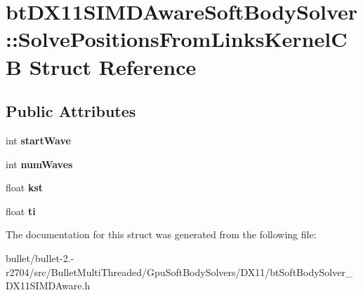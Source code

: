 \hypertarget{structbt_d_x11_s_i_m_d_aware_soft_body_solver_1_1_solve_positions_from_links_kernel_c_b}{\section{bt\+D\+X11\+S\+I\+M\+D\+Aware\+Soft\+Body\+Solver\+:\+:Solve\+Positions\+From\+Links\+Kernel\+C\+B Struct Reference}
\label{structbt_d_x11_s_i_m_d_aware_soft_body_solver_1_1_solve_positions_from_links_kernel_c_b}
}
\subsection*{Public Attributes}
\begin{DoxyCompactItemize}
\item 
\hypertarget{structbt_d_x11_s_i_m_d_aware_soft_body_solver_1_1_solve_positions_from_links_kernel_c_b_a654d6327235e044042f1e35dae898355}{int {\bfseries start\+Wave}}\label{structbt_d_x11_s_i_m_d_aware_soft_body_solver_1_1_solve_positions_from_links_kernel_c_b_a654d6327235e044042f1e35dae898355}

\item 
\hypertarget{structbt_d_x11_s_i_m_d_aware_soft_body_solver_1_1_solve_positions_from_links_kernel_c_b_a0fcad28c93856a2c5a8e5dfb55651402}{int {\bfseries num\+Waves}}\label{structbt_d_x11_s_i_m_d_aware_soft_body_solver_1_1_solve_positions_from_links_kernel_c_b_a0fcad28c93856a2c5a8e5dfb55651402}

\item 
\hypertarget{structbt_d_x11_s_i_m_d_aware_soft_body_solver_1_1_solve_positions_from_links_kernel_c_b_a6334f81a6199756e806f0ec4f60eb32d}{float {\bfseries kst}}\label{structbt_d_x11_s_i_m_d_aware_soft_body_solver_1_1_solve_positions_from_links_kernel_c_b_a6334f81a6199756e806f0ec4f60eb32d}

\item 
\hypertarget{structbt_d_x11_s_i_m_d_aware_soft_body_solver_1_1_solve_positions_from_links_kernel_c_b_ac9aae7fc709edbd1ac26e3296d8c4ac3}{float {\bfseries ti}}\label{structbt_d_x11_s_i_m_d_aware_soft_body_solver_1_1_solve_positions_from_links_kernel_c_b_ac9aae7fc709edbd1ac26e3296d8c4ac3}

\end{DoxyCompactItemize}


The documentation for this struct was generated from the following file\+:\begin{DoxyCompactItemize}
\item 
bullet/bullet-\/2.-\/r2704/src/\+Bullet\+Multi\+Threaded/\+Gpu\+Soft\+Body\+Solvers/\+D\+X11/bt\+Soft\+Body\+Solver\+\_\+\+D\+X11\+S\+I\+M\+D\+Aware.\+h\end{DoxyCompactItemize}
